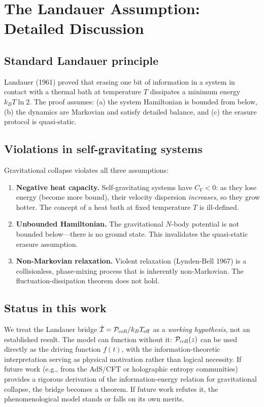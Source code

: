 \documentclass[aps,prd,onecolumn]{revtex4-2}
\begin{document}
\section{The Landauer Assumption: Detailed Discussion}

\subsection{Standard Landauer principle}

Landauer (1961) proved that erasing one bit of information in a system in contact with a thermal bath at temperature $T$ dissipates a minimum energy $k_B T \ln 2$. The proof assumes: (a) the system Hamiltonian is bounded from below, (b) the dynamics are Markovian and satisfy detailed balance, and (c) the erasure protocol is quasi-static.

\subsection{Violations in self-gravitating systems}

Gravitational collapse violates all three assumptions:
\begin{enumerate}
\item \textbf{Negative heat capacity.} Self-gravitating systems have $C_V < 0$: as they lose energy (become more bound), their velocity dispersion \emph{increases}, so they grow hotter. The concept of a heat bath at fixed temperature $T$ is ill-defined.
\item \textbf{Unbounded Hamiltonian.} The gravitational $N$-body potential is not bounded below---there is no ground state. This invalidates the quasi-static erasure assumption.
\item \textbf{Non-Markovian relaxation.} Violent relaxation (Lynden-Bell 1967) is a collisionless, phase-mixing process that is inherently non-Markovian. The fluctuation-dissipation theorem does not hold.
\end{enumerate}

\subsection{Status in this work}

We treat the Landauer bridge $\dot{\mathcal{I}} = \mathcal{P}_{\rm coll}/k_B T_{\rm eff}$ as a \emph{working hypothesis}, not an established result. The model can function without it: $\mathcal{P}_{\rm coll}(z)$ can be used directly as the driving function $f(t)$, with the information-theoretic interpretation serving as physical motivation rather than logical necessity. If future work (e.g., from the AdS/CFT or holographic entropy communities) provides a rigorous derivation of the information-energy relation for gravitational collapse, the bridge becomes a theorem. If future work refutes it, the phenomenological model stands or falls on its own merits.
\end{document}
